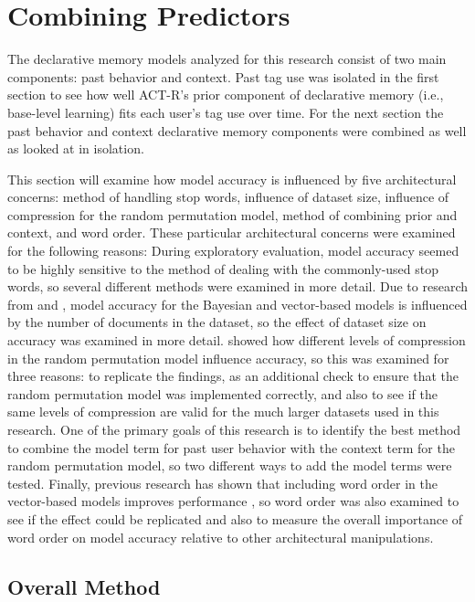 \documentclass[man,floatsintext,donotrepeattitle]{apa6}
\begin{document}
\section{Combining Predictors}

The declarative memory models analyzed for this research consist of two main components: past behavior and context.
Past tag use was isolated in the first section to see how well ACT-R's prior component of declarative memory (i.e., base-level learning) fits each user's tag use over time.
For the next section the past behavior and context declarative memory components were combined as well as looked at in isolation.

This section will examine how model accuracy is influenced by five architectural concerns:
method of handling stop words, influence of dataset size, influence of compression for the random permutation model, method of combining prior and context, and word order.
These particular architectural concerns were examined for the following reasons:
During exploratory evaluation, model accuracy seemed to be highly sensitive to the method of dealing with the commonly-used stop words, so several different methods were examined in more detail.
Due to research from \textcite{Budiu2007} and \textcite{Recchia2010}, model accuracy for the Bayesian and vector-based models is influenced by the number of documents in the dataset,
so the effect of dataset size on accuracy was examined in more detail.
\textcite{Sahlgren2008} showed how different levels of compression in the random permutation model influence accuracy, so this was examined for three reasons:
to replicate the findings, as an additional check to ensure that the random permutation model was implemented correctly, and also to see if the same levels of compression are valid for the much larger datasets used in this research.
One of the primary goals of this research is to identify the best method to combine the model term for past user behavior with the context term for the random permutation model,
so two different ways to add the model terms were tested.
Finally, previous research has shown that including word order in the vector-based models improves performance \parencites{Jones2007, Sahlgren2008},
so word order was also examined to see if the effect could be replicated and also to measure the overall importance of word order on model accuracy relative to other architectural manipulations.

\subsection{Overall Method}
\end{document}
